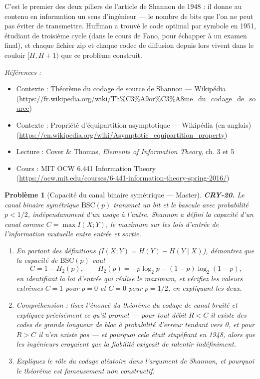 \documentclass[11pt]{article}
\newtheorem{problem}{Problème}
\newenvironment{refs}{\par\small\noindent\emph{Références :}\begin{itemize}\setlength\itemsep{0pt}}{\end{itemize}\normalsize}
\begin{document}
\noindent C'est le premier des deux piliers de l'article de Shannon de 1948 : il
donne au \og{} contenu en information \fg{} un sens d'ingénieur --- le nombre de bits que l'on ne peut
pas éviter de transmettre. Huffman a trouvé le code optimal par symbole en 1951, étudiant de
troisième cycle (dans le cours de Fano, pour échapper à un examen final), et chaque fichier
zip et chaque codec de diffusion depuis lors vivent dans le couloir $[H, H+1)$ que ce
problème construit.

\begin{refs}
\item Contexte : Théorème du codage de source de Shannon --- Wikipédia (\url{https://fr.wikipedia.org/wiki/Th%C3%A9or%C3%A8me_du_codage_de_source})
\item Contexte : Propriété d'équipartition asymptotique --- Wikipédia (en anglais) (\url{https://en.wikipedia.org/wiki/Asymptotic_equipartition_property})
\item Lecture : Cover \& Thomas, \textit{Elements of Information Theory}, ch. 3 et 5
\item Cours : MIT OCW 6.441 Information Theory (\url{https://ocw.mit.edu/courses/6-441-information-theory-spring-2016/})
\end{refs}

\bigskip

\begin{problem}[{Capacité du canal binaire symétrique --- Master}]
\textbf{CRY-20.} Le canal binaire symétrique $\mathrm{BSC}(p)$
transmet un bit et le bascule avec probabilité $p < 1/2$, indépendamment d'un usage à
l'autre. Shannon a défini la capacité d'un canal comme $C = \max I(X;Y)$, le maximum sur
les lois d'entrée de l'information mutuelle entre entrée et sortie.
\begin{enumerate}
\item[(a)] En partant des définitions ($I(X;Y) = H(Y) - H(Y \mid X)$), démontrez que la
capacité de $\mathrm{BSC}(p)$ vaut
\[ C = 1 - H_2(p), \qquad H_2(p) = -p\log_2 p - (1-p)\log_2(1-p), \]
en identifiant la loi d'entrée qui réalise le maximum, et vérifiez les valeurs extrêmes
$C = 1$ pour $p = 0$ et $C = 0$ pour $p = 1/2$, en expliquant les deux.
\item[(b)] Compréhension : lisez
l'énoncé du théorème du codage de canal bruité et expliquez précisément ce qu'il promet ---
pour tout débit $R < C$ il existe des codes de grande longueur de bloc à probabilité
d'erreur tendant vers 0, et pour $R > C$ il n'en existe pas --- et pourquoi cela était
stupéfiant en 1948, alors que les ingénieurs croyaient que la fiabilité exigeait de ralentir
indéfiniment.
\item[(c)] Expliquez le rôle du codage aléatoire dans l'argument de Shannon, et pourquoi
le théorème est fameusement non constructif.
\end{enumerate}

\end{problem}
\end{document}
